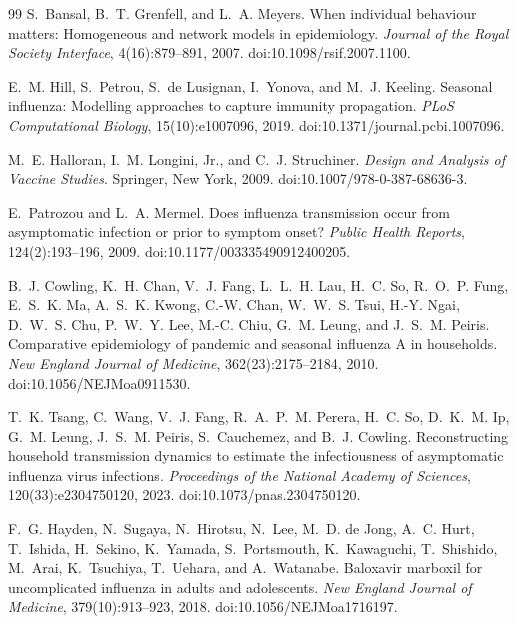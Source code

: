 \documentclass[12pt,a4paper]{article}
\theoremstyle{definition}
\theoremstyle{remark}
\begin{document}
\begin{thebibliography}{99}
S.~Bansal, B.~T. Grenfell, and L.~A. Meyers.
\newblock When individual behaviour matters: Homogeneous and network models in epidemiology.
\newblock \emph{Journal of the Royal Society Interface}, 4(16):879--891, 2007.
\newblock doi:10.1098/rsif.2007.1100.

E.~M. Hill, S.~Petrou, S.~de Lusignan, I.~Yonova, and M.~J. Keeling.
\newblock Seasonal influenza: Modelling approaches to capture immunity propagation.
\newblock \emph{PLoS Computational Biology}, 15(10):e1007096, 2019.
\newblock doi:10.1371/journal.pcbi.1007096.

M.~E. Halloran, I.~M. Longini, Jr., and C.~J. Struchiner.
\newblock \emph{Design and Analysis of Vaccine Studies}.
\newblock Springer, New York, 2009.
\newblock doi:10.1007/978-0-387-68636-3.

E.~Patrozou and L.~A. Mermel.
\newblock Does influenza transmission occur from asymptomatic infection or prior to symptom onset?
\newblock \emph{Public Health Reports}, 124(2):193--196, 2009.
\newblock doi:10.1177/003335490912400205.

B.~J. Cowling, K.~H. Chan, V.~J. Fang, L.~L.~H. Lau, H.~C. So,
R.~O.~P. Fung, E.~S.~K. Ma, A.~S.~K. Kwong, C.-W. Chan, W.~W.~S. Tsui,
H.-Y. Ngai, D.~W.~S. Chu, P.~W.~Y. Lee, M.-C. Chiu, G.~M. Leung,
and J.~S.~M. Peiris.
\newblock Comparative epidemiology of pandemic and seasonal influenza A in households.
\newblock \emph{New England Journal of Medicine}, 362(23):2175--2184, 2010.
\newblock doi:10.1056/NEJMoa0911530.

T.~K. Tsang, C.~Wang, V.~J. Fang, R.~A.~P.~M. Perera, H.~C. So,
D.~K.~M. Ip, G.~M. Leung, J.~S.~M. Peiris, S.~Cauchemez,
and B.~J. Cowling.
\newblock Reconstructing household transmission dynamics to estimate the infectiousness of asymptomatic influenza virus infections.
\newblock \emph{Proceedings of the National Academy of Sciences},
120(33):e2304750120, 2023.
\newblock doi:10.1073/pnas.2304750120.

F.~G. Hayden, N.~Sugaya, N.~Hirotsu, N.~Lee, M.~D. de Jong, A.~C. Hurt,
T.~Ishida, H.~Sekino, K.~Yamada, S.~Portsmouth, K.~Kawaguchi,
T.~Shishido, M.~Arai, K.~Tsuchiya, T.~Uehara, and A.~Watanabe.
\newblock Baloxavir marboxil for uncomplicated influenza in adults and adolescents.
\newblock \emph{New England Journal of Medicine}, 379(10):913--923, 2018.
\newblock doi:10.1056/NEJMoa1716197.


\end{thebibliography}
\end{document}
